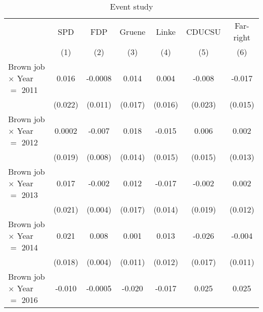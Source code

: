 
\begin{table}[htbp]
   \caption{Event study}
   \centering
   \begin{tabular}{lcccccc}
      \tabularnewline \midrule \midrule
                                        & SPD                    & FDP                     & Gruene                  & Linke                   & CDUCSU                  & Far-right\\  
                                        & (1)                    & (2)                     & (3)                     & (4)                     & (5)                     & (6)\\  
      Brown job $\times$ Year $=$ 2011  & 0.016                  & -0.0008                 & 0.014                   & 0.004                   & -0.008                  & -0.017\\   
                                        & (0.022)                & (0.011)                 & (0.017)                 & (0.016)                 & (0.023)                 & (0.015)\\   
      Brown job $\times$ Year $=$ 2012  & 0.0002                 & -0.007                  & 0.018                   & -0.015                  & 0.006                   & 0.002\\   
                                        & (0.019)                & (0.008)                 & (0.014)                 & (0.015)                 & (0.015)                 & (0.013)\\   
      Brown job $\times$ Year $=$ 2013  & 0.017                  & -0.002                  & 0.012                   & -0.017                  & -0.002                  & 0.002\\   
                                        & (0.021)                & (0.004)                 & (0.017)                 & (0.014)                 & (0.019)                 & (0.012)\\   
      Brown job $\times$ Year $=$ 2014  & 0.021                  & 0.008                   & 0.001                   & 0.013                   & -0.026                  & -0.004\\   
                                        & (0.018)                & (0.004)                 & (0.011)                 & (0.012)                 & (0.017)                 & (0.011)\\   
      Brown job $\times$ Year $=$ 2016  & -0.010                 & -0.0005                 & -0.020                  & -0.017                  & 0.025                   & 0.025\\   

\end{tabular}
\end{table}
